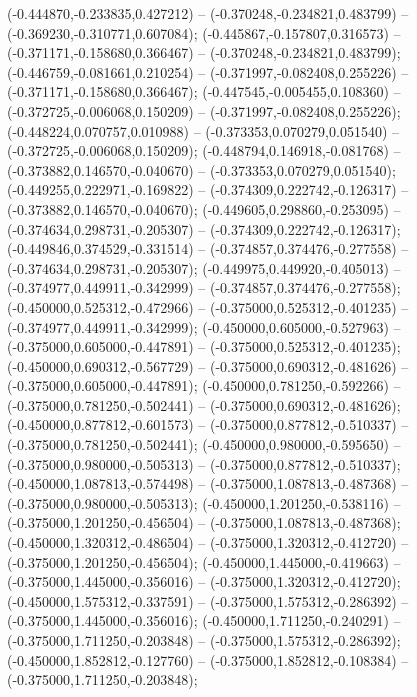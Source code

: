  (-0.444870,-0.233835,0.427212) -- (-0.370248,-0.234821,0.483799) -- (-0.369230,-0.310771,0.607084);
 (-0.445867,-0.157807,0.316573) -- (-0.371171,-0.158680,0.366467) -- (-0.370248,-0.234821,0.483799);
 (-0.446759,-0.081661,0.210254) -- (-0.371997,-0.082408,0.255226) -- (-0.371171,-0.158680,0.366467);
 (-0.447545,-0.005455,0.108360) -- (-0.372725,-0.006068,0.150209) -- (-0.371997,-0.082408,0.255226);
 (-0.448224,0.070757,0.010988) -- (-0.373353,0.070279,0.051540) -- (-0.372725,-0.006068,0.150209);
 (-0.448794,0.146918,-0.081768) -- (-0.373882,0.146570,-0.040670) -- (-0.373353,0.070279,0.051540);
 (-0.449255,0.222971,-0.169822) -- (-0.374309,0.222742,-0.126317) -- (-0.373882,0.146570,-0.040670);
 (-0.449605,0.298860,-0.253095) -- (-0.374634,0.298731,-0.205307) -- (-0.374309,0.222742,-0.126317);
 (-0.449846,0.374529,-0.331514) -- (-0.374857,0.374476,-0.277558) -- (-0.374634,0.298731,-0.205307);
 (-0.449975,0.449920,-0.405013) -- (-0.374977,0.449911,-0.342999) -- (-0.374857,0.374476,-0.277558);
 (-0.450000,0.525312,-0.472966) -- (-0.375000,0.525312,-0.401235) -- (-0.374977,0.449911,-0.342999);
 (-0.450000,0.605000,-0.527963) -- (-0.375000,0.605000,-0.447891) -- (-0.375000,0.525312,-0.401235);
 (-0.450000,0.690312,-0.567729) -- (-0.375000,0.690312,-0.481626) -- (-0.375000,0.605000,-0.447891);
 (-0.450000,0.781250,-0.592266) -- (-0.375000,0.781250,-0.502441) -- (-0.375000,0.690312,-0.481626);
 (-0.450000,0.877812,-0.601573) -- (-0.375000,0.877812,-0.510337) -- (-0.375000,0.781250,-0.502441);
 (-0.450000,0.980000,-0.595650) -- (-0.375000,0.980000,-0.505313) -- (-0.375000,0.877812,-0.510337);
 (-0.450000,1.087813,-0.574498) -- (-0.375000,1.087813,-0.487368) -- (-0.375000,0.980000,-0.505313);
 (-0.450000,1.201250,-0.538116) -- (-0.375000,1.201250,-0.456504) -- (-0.375000,1.087813,-0.487368);
 (-0.450000,1.320312,-0.486504) -- (-0.375000,1.320312,-0.412720) -- (-0.375000,1.201250,-0.456504);
 (-0.450000,1.445000,-0.419663) -- (-0.375000,1.445000,-0.356016) -- (-0.375000,1.320312,-0.412720);
 (-0.450000,1.575312,-0.337591) -- (-0.375000,1.575312,-0.286392) -- (-0.375000,1.445000,-0.356016);
 (-0.450000,1.711250,-0.240291) -- (-0.375000,1.711250,-0.203848) -- (-0.375000,1.575312,-0.286392);
 (-0.450000,1.852812,-0.127760) -- (-0.375000,1.852812,-0.108384) -- (-0.375000,1.711250,-0.203848);
